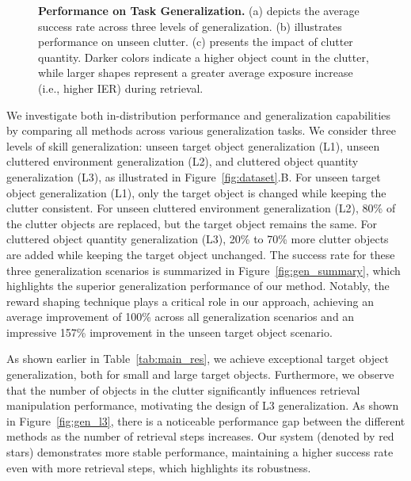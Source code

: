 \documentclass[10pt, a4paper, logo, twocolumn, copyright]{psibot} %
\begin{document}
\begin{figure*}[ht]
    \centering
    \caption{\textbf{Performance on Task Generalization.} (a) depicts the average success rate across three levels of generalization. (b) illustrates performance on unseen clutter. (c) presents the impact of clutter quantity. Darker colors indicate a higher object count in the clutter, while larger shapes represent a greater average exposure increase (i.e., higher IER) during retrieval.}
    \label{fig:novel_behavior}
\end{figure*}

We investigate both in-distribution performance and generalization capabilities by comparing all methods across various generalization tasks. We consider three levels of skill generalization: unseen target object generalization (L1), unseen cluttered environment generalization (L2), and cluttered object quantity generalization (L3), as illustrated in Figure~\ref{fig:dataset}.B. For unseen target object generalization (L1), only the target object is changed while keeping the clutter consistent. For unseen cluttered environment generalization (L2), 80\% of the clutter objects are replaced, but the target object remains the same. For cluttered object quantity generalization (L3), 20\% to 70\% more clutter objects are added while keeping the target object unchanged. The success rate for these three generalization scenarios is summarized in Figure~\ref{fig:gen_summary}, which highlights the superior generalization performance of our method. Notably, the reward shaping technique plays a critical role in our approach, achieving an average improvement of 100\% across all generalization scenarios and an impressive 157\% improvement in the unseen target object scenario.

As shown earlier in Table~\ref{tab:main_res}, we achieve exceptional target object generalization, both for small and large target objects.
Furthermore, we observe that the number of objects in the clutter significantly influences retrieval manipulation performance, motivating the design of L3 generalization. As shown in Figure~\ref{fig:gen_l3}, there is a noticeable performance gap between the different methods as the number of retrieval steps increases. Our system (denoted by red stars) demonstrates more stable performance, maintaining a higher success rate even with more retrieval steps, which highlights its robustness.
\end{document}
